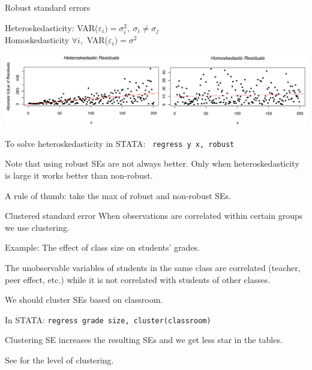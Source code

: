 \documentclass{beamer}
\begin{document}
\begin{frame}{Robust standard errors}

Heteroskedasticity: VAR($\varepsilon_i)=\sigma_i^2,\ \sigma_i\neq\sigma_j$\\
Homoskedasticity $\forall i,$  VAR($\varepsilon_i)=\sigma^2$\medskip

\includegraphics[width=1\linewidth]{./Figures/robust}

To solve heteroskedasticity in STATA: \texttt{ regress y x, robust}\bigskip

Note that using robust SEs are not always better. Only when heteroskedasticity is large it works better than non-robust.\medskip

A rule of thumb: take the max of robust and non-robust SEs.
\end{frame}


\begin{frame}{Clustered standard error}
When observations are correlated within certain groups we use clustering.\bigskip

Example: The effect of class size on students' grades. \medskip

The unobservable variables of students in the same class are correlated (teacher, peer effect, etc.) while it is not correlated with students of other classes.\bigskip

We should cluster SEs based on classroom.\bigskip

In STATA:  \quad \texttt{regress grade size, cluster(classroom)}\bigskip

Clustering SE increases the resulting SEs and we get less star in the tables.\bigskip

See \cite{abadie2023should} for the level of clustering.
\end{frame}
\end{document}
